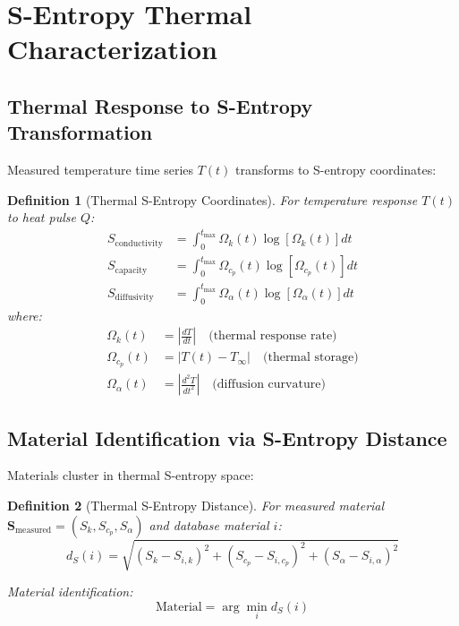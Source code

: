 \documentclass[12pt,a4paper]{article}
\newtheorem{definition}{Definition}
\begin{document}
\section{S-Entropy Thermal Characterization}

\subsection{Thermal Response to S-Entropy Transformation}

Measured temperature time series $T(t)$ transforms to S-entropy coordinates:

\begin{definition}[Thermal S-Entropy Coordinates]
For temperature response $T(t)$ to heat pulse $Q$:
\begin{align}
S_{\text{conductivity}} &= \int_0^{t_{\text{max}}} \Omega_k(t) \log[\Omega_k(t)] dt \\
S_{\text{capacity}} &= \int_0^{t_{\text{max}}} \Omega_{c_p}(t) \log[\Omega_{c_p}(t)] dt \\
S_{\text{diffusivity}} &= \int_0^{t_{\text{max}}} \Omega_{\alpha}(t) \log[\Omega_{\alpha}(t)] dt
\end{align}
where:
\begin{align}
\Omega_k(t) &= \left|\frac{dT}{dt}\right| \quad \text{(thermal response rate)} \\
\Omega_{c_p}(t) &= |T(t) - T_{\infty}| \quad \text{(thermal storage)} \\
\Omega_{\alpha}(t) &= \left|\frac{d^2T}{dt^2}\right| \quad \text{(diffusion curvature)}
\end{align}
\end{definition}

\subsection{Material Identification via S-Entropy Distance}

Materials cluster in thermal S-entropy space:

\begin{definition}[Thermal S-Entropy Distance]
For measured material $\mathbf{S}_{\text{measured}} = (S_k, S_{c_p}, S_{\alpha})$ and database material $i$:
\begin{equation}
d_S(i) = \sqrt{(S_k - S_{i,k})^2 + (S_{c_p} - S_{i,c_p})^2 + (S_{\alpha} - S_{i,\alpha})^2}
\end{equation}

Material identification:
\begin{equation}
\text{Material} = \arg\min_i d_S(i)
\end{equation}
\end{definition}
\end{document}

